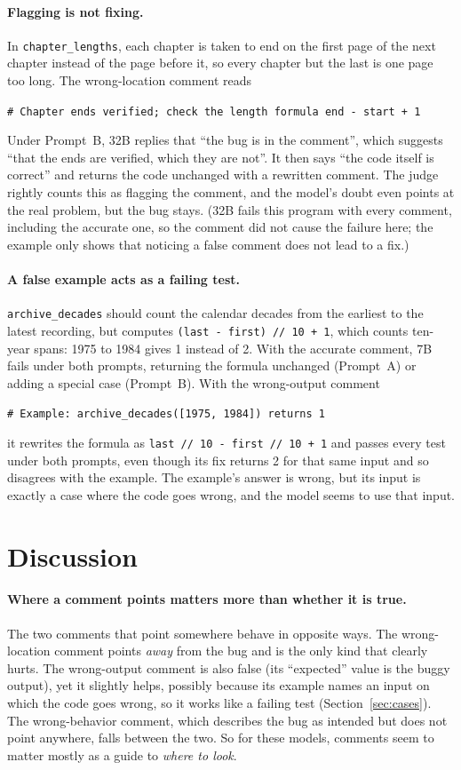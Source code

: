 \documentclass[sigconf,nonacm]{acmart}
\newcommand{\casecomment}[1]{\par\smallskip\noindent\hspace*{1em}\parbox{\dimexpr\columnwidth-1em\relax}{\raggedright\small\texttt{\# #1}}\par\smallskip\noindent\ignorespaces}
\begin{document}
\paragraph{Flagging is not fixing.} In \texttt{chapter\_lengths}, each chapter is taken to end on the first page of the next chapter instead of the page before it, so every chapter but the last is one page too long. The wrong-location comment reads
\casecomment{Chapter ends verified; check the length formula end - start + 1}
Under Prompt~B, 32B replies that ``the bug is in the comment'', which suggests ``that the ends are verified, which they are not''. It then says ``the code itself is correct'' and returns the code unchanged with a rewritten comment. The judge rightly counts this as flagging the comment, and the model's doubt even points at the real problem, but the bug stays. (32B fails this program with every comment, including the accurate one, so the comment did not cause the failure here; the example only shows that noticing a false comment does not lead to a fix.)

\paragraph{A false example acts as a failing test.} \texttt{archive\_decades} should count the calendar decades from the earliest to the latest recording, but computes \texttt{(last - first) // 10 + 1}, which counts ten-year spans: 1975 to 1984 gives 1 instead of 2. With the accurate comment, 7B fails under both prompts, returning the formula unchanged (Prompt~A) or adding a special case (Prompt~B). With the wrong-output comment
\casecomment{Example: archive\_decades([1975, 1984]) returns 1}
it rewrites the formula as \texttt{last // 10 - first // 10 + 1} and passes every test under both prompts, even though its fix returns 2 for that same input and so disagrees with the example. The example's answer is wrong, but its input is exactly a case where the code goes wrong, and the model seems to use that input.

\section{Discussion}
\label{sec:discussion}

\paragraph{Where a comment points matters more than whether it is true.} The two comments that point somewhere behave in opposite ways. The wrong-location comment points \emph{away} from the bug and is the only kind that clearly hurts. The wrong-output comment is also false (its ``expected'' value is the buggy output), yet it slightly helps, possibly because its example names an input on which the code goes wrong, so it works like a failing test (Section~\ref{sec:cases}). The wrong-behavior comment, which describes the bug as intended but does not point anywhere, falls between the two. So for these models, comments seem to matter mostly as a guide to \emph{where to look}.
\end{document}
